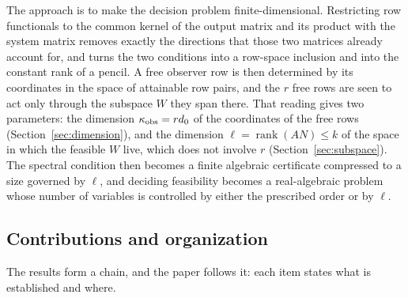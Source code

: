 \documentclass[journal]{IEEEtran}
\theoremstyle{plainn}
\theoremstyle{remark}
\begin{document}
The approach is to make the decision problem finite-dimensional. Restricting row
functionals to the common kernel of the output matrix and its product with the system
matrix removes exactly the directions that those two matrices already account for, and
turns the two conditions into a row-space inclusion and into the constant rank of a
pencil. A free observer row is then determined by its coordinates in the space of
attainable row pairs, and the $r$ free rows are seen to act only through the subspace $W$
they span there. That reading gives two parameters: the dimension $\kappa_{\rm obs}=rd_0$
of the coordinates of the free rows (Section~\ref{sec:dimension}), and the dimension
$\ell=\operatorname{rank}(AN)\le k$ of the space in which the feasible $W$ live, which does
not involve $r$ (Section~\ref{sec:subspace}). The spectral condition then becomes a finite
algebraic certificate compressed to a size governed by $\ell$, and deciding feasibility becomes a
real-algebraic problem whose number of variables is controlled by either the prescribed order or by
$\ell$.

\subsection{Contributions and organization}\label{sec:contrib}

The results form a chain, and the paper follows it: each item states what is established and where.
\end{document}
